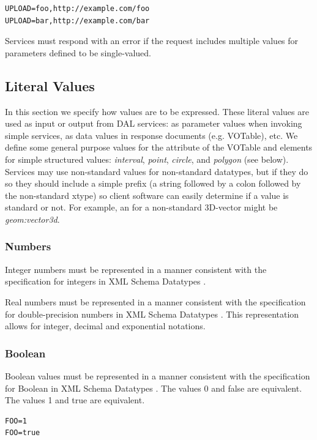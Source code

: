 \documentclass[11pt,letter]{ivoa}
\begin{document}
\begin{verbatim}
UPLOAD=foo,http://example.com/foo
UPLOAD=bar,http://example.com/bar
\end{verbatim}

Services must respond with an error if the request includes multiple values for 
parameters defined to be single-valued.

\subsection{Literal Values}
In this section we specify how values are to be expressed. These literal values 
are used as input or output from DAL services: as parameter values when 
invoking simple services, as data values in response documents (e.g. VOTable), 
etc. We define some general purpose values for the  attribute of 
the VOTable  and  elements  for simple
structured values: \emph{interval}, 
\emph{point}, \emph{circle}, and \emph{polygon} (see below). Services may 
use non-standard  values for non-standard datatypes, but if they 
do so they should include a simple prefix (a string followed by a colon 
followed by the non-standard xtype) so client software can easily determine 
if a value is standard or not. For example, an  for a 
non-standard 3D-vector might be \emph{geom:vector3d}.

\subsubsection{Numbers}
Integer numbers must be represented in a manner consistent with the 
specification for integers in XML Schema Datatypes \citep{std:XSD2}.

Real numbers must be represented in a manner consistent with the specification 
for double-precision numbers in XML Schema Datatypes \citep{std:XSD2}. This 
representation allows for integer, decimal and exponential notations.

\subsubsection{Boolean}
Boolean values must be represented in a manner consistent with the 
specification 
for Boolean in XML Schema Datatypes \citep{std:XSD2}. The values 0 and false 
are equivalent. The values 1 and true are equivalent.  

\begin{verbatim}
FOO=1
FOO=true
\end{verbatim}
\end{document}
